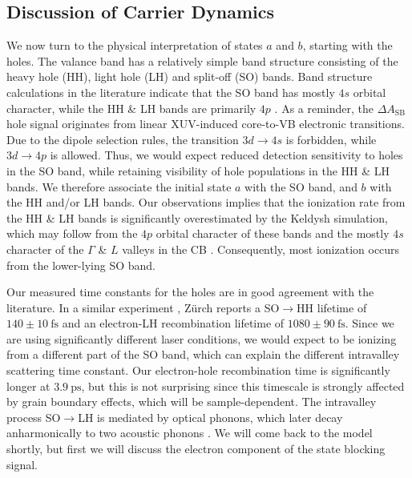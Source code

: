 \subsection{Discussion of Carrier Dynamics}
\label{sec:carrier_dyn_discussion}

We now turn to the physical interpretation of states $a$ and $b$, starting with the holes. The valance band has a relatively simple band structure consisting of the heavy hole (HH), light hole (LH) and split-off (SO) bands. Band structure calculations in the literature indicate that the SO band has mostly $4s$ orbital character, while the HH \& LH bands are primarily $4p$ \cite{zurchDirectSimultaneousObservation2017}. As a reminder, the $\Delta A_{\textrm{SB}}$ hole signal originates from linear XUV-induced core-to-VB electronic transitions. Due to the dipole selection rules, the transition $3d \rightarrow 4s$ is forbidden, while $3d \rightarrow 4p$ is allowed. Thus, we would expect reduced detection sensitivity to holes in the SO band, while retaining visibility of hole populations in the HH \& LH bands. We therefore associate the initial state $a$ with the SO band, and $b$ with the HH and/or LH bands. Our observations implies that the ionization rate from the HH \& LH bands is significantly overestimated by the Keldysh simulation, which may follow from the $4p$ orbital character of these bands and the mostly $4s$ character of the $\Gamma$ \& $L$ valleys in the CB \cite{kaplanFemtosecondTrackingCarrier2018}. Consequently, most ionization occurs from the lower-lying SO band.

Our measured time constants for the holes are in good agreement with the literature. In a similar experiment \cite{zurchDirectSimultaneousObservation2017}, Z\"{u}rch reports a SO$\rightarrow$HH lifetime of $140 \pm 10 \ \textrm{fs}$ and an electron-LH recombination lifetime of $1080 \pm 90 \ \textrm{fs}$. Since we are using significantly different laser conditions, we would expect to be ionizing from a different part of the SO band, which can explain the different intravalley scattering time constant. Our electron-hole recombination time is significantly longer at $3.9 \ \textrm{ps}$, but this is not surprising since this timescale is strongly affected by grain boundary effects, which will be sample-dependent. The intravalley process SO$\rightarrow$LH is mediated by optical phonons, which later decay anharmonically to two acoustic phonons \cite{kaplanFemtosecondTrackingCarrier2018}. We will come back to the model shortly, but first we will discuss the electron component of the state blocking signal.

